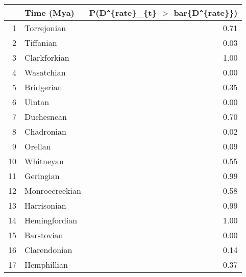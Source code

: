 \begin{table}[ht]
\centering
\begin{tabular}{rlr}
  \hline
 & Time (Mya) & P(D\verb|^|\{rate\}\_\{t\} $>$ bar\{D\verb|^|\{rate\}\}) \\ 
  \hline
1 & Torrejonian & 0.71 \\ 
  2 & Tiffanian & 0.03 \\ 
  3 & Clarkforkian & 1.00 \\ 
  4 & Wasatchian & 0.00 \\ 
  5 & Bridgerian & 0.35 \\ 
  6 & Uintan & 0.00 \\ 
  7 & Duchesnean & 0.70 \\ 
  8 & Chadronian & 0.02 \\ 
  9 & Orellan & 0.09 \\ 
  10 & Whitneyan & 0.55 \\ 
  11 & Geringian & 0.99 \\ 
  12 & Monroecreekian & 0.58 \\ 
  13 & Harrisonian & 0.99 \\ 
  14 & Hemingfordian & 1.00 \\ 
  15 & Barstovian & 0.00 \\ 
  16 & Clarendonian & 0.14 \\ 
  17 & Hemphillian & 0.37 \\ 
   \hline
\end{tabular}
\label{tab:rate_peak}
\end{table}
